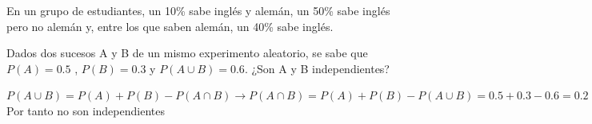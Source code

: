 \documentclass[addpoints,spanish, 12pt,a4paper]{exam}
\begin{document}
\begin{questions}
\question En un grupo de estudiantes, un 10\% sabe inglés y alemán, un 50\% sabe inglés pero no alemán y, entre los que saben alemán, un 40\% sabe inglés.

\question[2] Dados dos sucesos A y B de un mismo experimento aleatorio, se sabe que 
  $P(A)=0.5$ , $P(B)=0.3$ y $P(A\cup B)=0.6$. 
  ¿Son A y B independientes?
  \begin{solution}
  $P(A\cup B)=P(A)+P(B)-P(A\cap B) 
  \to P(A\cap B)=P(A)+P(B)-P(A\cup B)=0.5+0.3-0.6=0.2\neq 0.15=0.5 \cdot 0.3=P(A) \cdot P(B)$ \\
  Por tanto no son independientes  
  \end{solution}
  
\end{questions}
\end{document}
